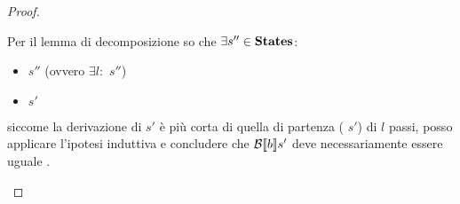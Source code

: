 {\begin{proof}
\begin{itemize}
             Per il lemma di decomposizione so che $\exists s''\in\mbox{\textbf{States}}$:
             \begin{itemize}
             \item {} \Rar{*} $s''$ (ovvero $\exists l:$
                 $s''$)
             \item {} \Rar{*} $s'$
             \end{itemize}
             siccome la derivazione di  \Rar{*} $s'$ è più
             corta di quella di partenza ( \Rar{*} $s'$)
             di $l$ passi, posso applicare l'ipotesi
             induttiva e concludere che $\mathcal{B} \llbracket b \rrbracket s'$ deve necessariamente essere
             uguale \semfalse.
             
            \end{itemize} 
           \end{proof}
         }
